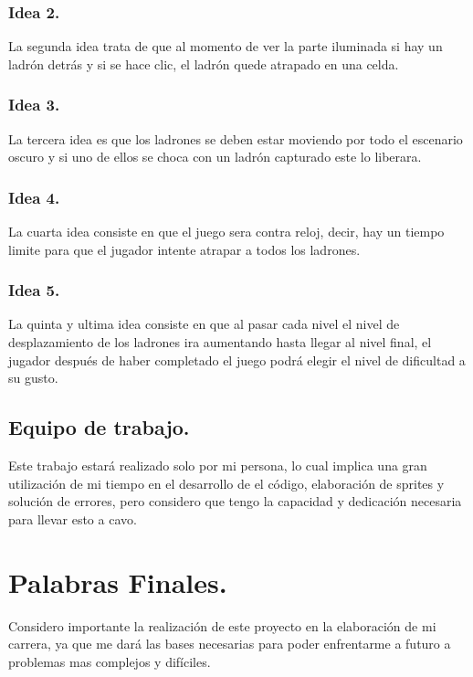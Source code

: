 \documentclass{article}
\begin{document}
\subsubsection{Idea 2.}
La segunda idea trata de que al momento de ver la parte iluminada si hay un ladrón detrás y si se hace clic, el ladrón quede atrapado en una celda.
\subsubsection{Idea 3.}
La tercera idea es que los ladrones se deben estar moviendo por todo el escenario oscuro y si uno de ellos se choca con un ladrón capturado este lo liberara.
\subsubsection{Idea 4.}
La cuarta idea consiste en que el juego sera contra reloj, decir, hay un tiempo limite para que el jugador intente atrapar a todos los ladrones.
\subsubsection{Idea 5.}
La quinta y ultima idea consiste en que al pasar cada nivel el nivel de desplazamiento de los ladrones ira aumentando hasta llegar al nivel final, el jugador después de haber completado el juego podrá elegir el nivel de dificultad a su gusto.
\subsection{Equipo de trabajo.}
Este trabajo estará realizado solo por mi persona, lo cual implica una gran utilización de mi tiempo en el desarrollo de el código, elaboración de sprites y solución de errores, pero considero que tengo la capacidad y dedicación necesaria para llevar esto a cavo.

\section{Palabras Finales.}
Considero importante la realización de este proyecto en la elaboración de mi carrera, ya que me dará las bases necesarias para poder enfrentarme a futuro a problemas mas complejos y difíciles.
\end{document}
